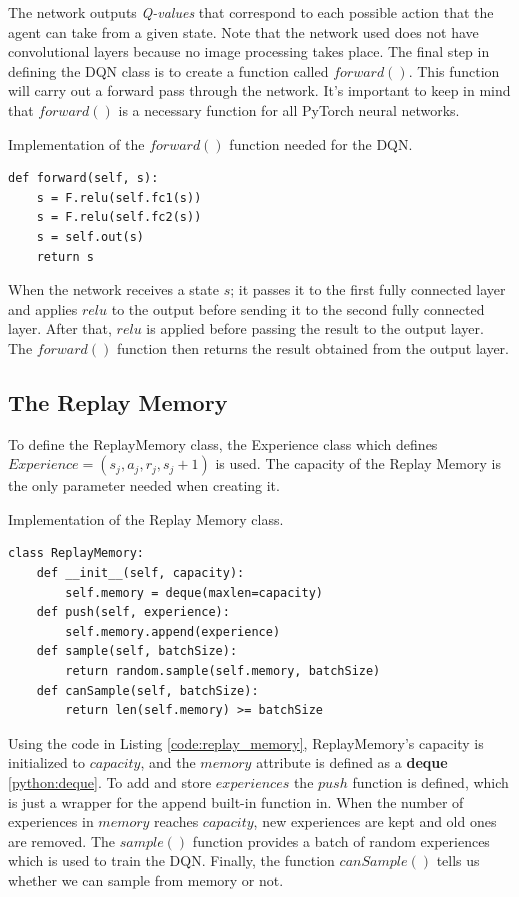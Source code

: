 \documentclass[12pt,oneside]{article}
\begin{document}
The network outputs \textit{Q-values} that correspond to each possible action that the agent can take from a given state. Note that the network used does not have convolutional layers because no image processing takes place.
The final step in defining the DQN class is to create a function called $forward()$. This function will carry out a forward pass through the network. It's important to keep in mind that $forward()$ is a necessary function for all PyTorch neural networks.

\begin{listing}[htbp]
\caption{Implementation of the $forward()$ function needed for the DQN.}
\label{code:nn_class_2}
\begin{verbatim}
def forward(self, s):
    s = F.relu(self.fc1(s))
    s = F.relu(self.fc2(s))
    s = self.out(s)
    return s
\end{verbatim}
\end{listing} 
When the network receives a state $s$; it passes it to the first fully connected layer and applies $relu$ to the output before sending it to the second fully connected layer. After that, $relu$ is applied before passing the result to the output layer. The $forward()$ function then returns the result obtained from the output layer.

\subsection{The Replay Memory}
To define the ReplayMemory class, the Experience class which defines $Experience=(s_j, a_j, r_j, s_j+1)$ is used. The capacity of the Replay Memory is the only parameter needed when creating it.
\begin{listing}[htbp]
\caption{Implementation of the Replay Memory class.}
\label{code:replay_memory}
\begin{verbatim}
class ReplayMemory:
    def __init__(self, capacity):
        self.memory = deque(maxlen=capacity)
    def push(self, experience):
        self.memory.append(experience)
    def sample(self, batchSize):
        return random.sample(self.memory, batchSize)
    def canSample(self, batchSize):
        return len(self.memory) >= batchSize
\end{verbatim}
\end{listing} 

Using the code in Listing \ref{code:replay_memory}, ReplayMemory's capacity is initialized to $capacity$, and the $memory$ attribute is defined as a \textbf{deque} \ref{python:deque}. To add and store $experiences$ the $push$ function is defined, which is just a wrapper for the append built-in function in. When the number of experiences in $memory$ reaches $capacity$, new experiences are kept and old ones are removed. The $sample()$ function provides a batch of random experiences which is used to train the DQN. Finally, the function $canSample()$ tells us whether we can sample from memory or not.
\end{document}
